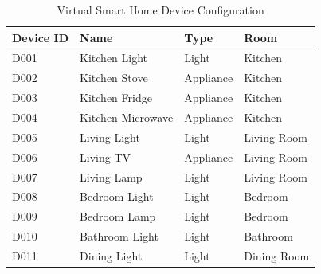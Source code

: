 \begin{table}[t]
\centering
\caption{Virtual Smart Home Device Configuration}
\label{tab:virtual_devices}
\begin{tabular}{@{}llll@{}}
\toprule
\textbf{Device ID} & \textbf{Name} & \textbf{Type} & \textbf{Room} \\
\midrule
D001 & Kitchen Light & Light & Kitchen \\
D002 & Kitchen Stove & Appliance & Kitchen \\
D003 & Kitchen Fridge & Appliance & Kitchen \\
D004 & Kitchen Microwave & Appliance & Kitchen \\
D005 & Living Light & Light & Living Room \\
D006 & Living TV & Appliance & Living Room \\
D007 & Living Lamp & Light & Living Room \\
D008 & Bedroom Light & Light & Bedroom \\
D009 & Bedroom Lamp & Light & Bedroom \\
D010 & Bathroom Light & Light & Bathroom \\
D011 & Dining Light & Light & Dining Room \\
\bottomrule
\end{tabular}
\end{table}


